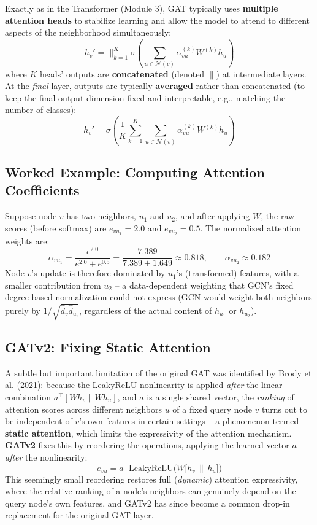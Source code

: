 \documentclass[12pt,a4paper]{article}
\begin{document}
Exactly as in the Transformer (Module 3), GAT typically uses \textbf{multiple attention heads} to stabilize learning and allow the model to attend to different aspects of the neighborhood simultaneously:
\[
h_v' = \Big\|_{k=1}^{K} \sigma\left(\sum_{u \in \mathcal{N}(v)} \alpha_{vu}^{(k)} W^{(k)} h_u\right)
\]
where $K$ heads' outputs are \textbf{concatenated} (denoted $\|$) at intermediate layers. At the \emph{final} layer, outputs are typically \textbf{averaged} rather than concatenated (to keep the final output dimension fixed and interpretable, e.g., matching the number of classes):
\[
h_v' = \sigma\left(\frac{1}{K}\sum_{k=1}^{K} \sum_{u \in \mathcal{N}(v)} \alpha_{vu}^{(k)} W^{(k)} h_u\right)
\]

\subsection{Worked Example: Computing Attention Coefficients}

\begin{example}
Suppose node $v$ has two neighbors, $u_1$ and $u_2$, and after applying $W$, the raw scores (before softmax) are $e_{vu_1} = 2.0$ and $e_{vu_2} = 0.5$. The normalized attention weights are:
\[
\alpha_{vu_1} = \frac{e^{2.0}}{e^{2.0}+e^{0.5}} = \frac{7.389}{7.389+1.649} \approx 0.818, \qquad
\alpha_{vu_2} \approx 0.182
\]
Node $v$'s update is therefore dominated by $u_1$'s (transformed) features, with a smaller contribution from $u_2$ -- a data-dependent weighting that GCN's fixed degree-based normalization could not express (GCN would weight both neighbors purely by $1/\sqrt{\hat d_v \hat d_{u_i}}$, regardless of the actual content of $h_{u_1}$ or $h_{u_2}$).
\end{example}

\subsection{GATv2: Fixing Static Attention}

A subtle but important limitation of the original GAT was identified by Brody et al. (2021): because the LeakyReLU nonlinearity is applied \emph{after} the linear combination $a^\top[Wh_v \| Wh_u]$, and $a$ is a single shared vector, the \emph{ranking} of attention scores across different neighbors $u$ of a fixed query node $v$ turns out to be independent of $v$'s own features in certain settings -- a phenomenon termed \textbf{static attention}, which limits the expressivity of the attention mechanism. \textbf{GATv2} fixes this by reordering the operations, applying the learned vector $a$ \emph{after} the nonlinearity:
\[
e_{vu} = a^\top \text{LeakyReLU}\Big(W\big[h_v \,\|\, h_u\big]\Big)
\]
This seemingly small reordering restores full (\emph{dynamic}) attention expressivity, where the relative ranking of a node's neighbors can genuinely depend on the query node's own features, and GATv2 has since become a common drop-in replacement for the original GAT layer.
\end{document}
